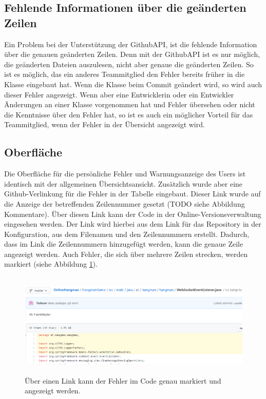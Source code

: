 \subsection{Fehlende Informationen über die geänderten Zeilen}
Ein Problem bei der Unterstützung der GithubAPI, ist die fehlende Information über die genauen geänderten Zeilen. Denn mit der GithubAPI ist es nur möglich, die geänderten Dateien auszulesen, nicht aber genaue die geänderten Zeilen. So ist es möglich, das ein anderes Teammitglied den Fehler bereits früher in die Klasse eingebaut hat. Wenn die Klasse beim Commit geändert wird, so wird auch dieser Fehler angezeigt. Wenn aber eine Entwicklerin oder ein Entwickler Änderungen an einer Klasse vorgenommen hat und Fehler übersehen oder nicht die Kenntnisse über den Fehler hat, so ist es auch ein möglicher Vorteil für das Teammitglied, wenn der Fehler in der Übersicht angezeigt wird. 
\subsection{Oberfläche}
Die Oberfläche für die persönliche Fehler und Warnungsanzeige des Users ist identisch mit der allgemeinen Übersichtsansicht. Zusätzlich wurde aber eine Github-Verlinkung für die Fehler in der Tabelle eingebaut. Dieser Link wurde auf die Anzeige der betreffenden Zeilennummer gesetzt (TODO siehe Abbildung Kommentare). Über diesen Link kann der Code in der Online-Versionsverwaltung eingesehen werden. Der Link wird hierbei aus dem Link für das Repository in der Konfiguration, aus dem Filenamen und den Zeilennummern erstellt. Dadurch, dass im Link die Zeilennummern hinzugefügt werden, kann die genaue Zeile angezeigt werden. Auch Fehler, die sich über mehrere Zeilen strecken, werden markiert (siehe Abbildung \ref{fig:markedFindings}). 
\begin{figure}[tp]
  \centering
  \includegraphics[height=5cm]{images/markedFindings.PNG}
 \caption[Anzeige der markierten Fehler]{Über einen Link kann der Fehler im Code genau markiert und angezeigt werden.}
  \label{fig:markedFindings}
\end{figure}
